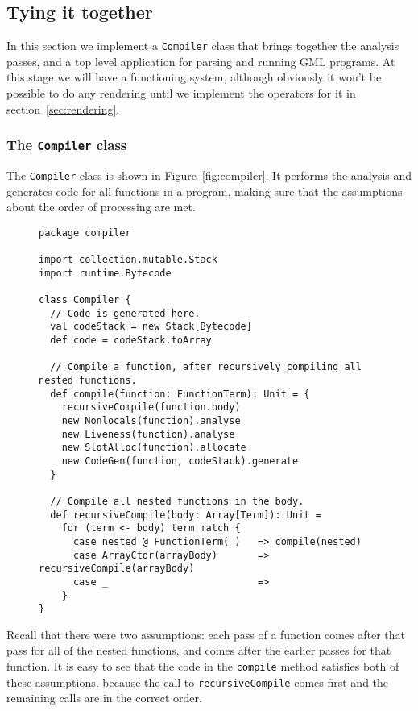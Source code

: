 \subsection{Tying it together\label{sec:tying}}

In this section we implement a \verb!Compiler! class that
brings together the analysis passes,
and a top level application for parsing and running GML programs.
At this stage we will have a functioning system,
although obviously it won't be possible to do any rendering
until we implement the operators for it in section~\ref{sec:rendering}.

\subsubsection{The \texttt{Compiler} class\label{sec:compiler}}

The \verb!Compiler! class is shown in Figure~\ref{fig:compiler}.
It performs the analysis and generates code for all functions in a program,
making sure that the assumptions about the order of processing are met.

\begin{figure}
\begin{verbatim}
package compiler

import collection.mutable.Stack
import runtime.Bytecode

class Compiler {
  // Code is generated here.
  val codeStack = new Stack[Bytecode]
  def code = codeStack.toArray

  // Compile a function, after recursively compiling all nested functions.
  def compile(function: FunctionTerm): Unit = {
    recursiveCompile(function.body)
    new Nonlocals(function).analyse
    new Liveness(function).analyse
    new SlotAlloc(function).allocate
    new CodeGen(function, codeStack).generate
  }

  // Compile all nested functions in the body.
  def recursiveCompile(body: Array[Term]): Unit =
    for (term <- body) term match {
      case nested @ FunctionTerm(_)   => compile(nested)
      case ArrayCtor(arrayBody)       => recursiveCompile(arrayBody)
      case _                          =>
    }
}
\end{verbatim}
\getcaption
\end{figure}

Recall that there were two assumptions:
each pass of a function comes after that pass for all of the nested functions,
and comes after the earlier passes for that function.
It is easy to see that the code in the \verb!compile! method
satisfies both of these assumptions,
because the call to \verb!recursiveCompile! comes first
and the remaining calls are in the correct order.

